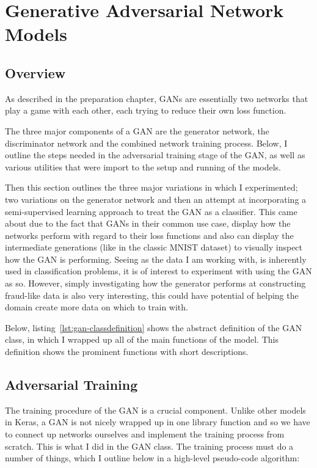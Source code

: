 \documentclass[12pt,a4paper,twoside]{report}
\begin{document}
\section{Generative Adversarial Network Models}

\subsection{Overview}
As described in the preparation chapter, GANs are essentially two networks that play a game with each other, each trying to reduce their own loss function. 

The three major components of a GAN are the generator network, the discriminator network and the combined network training process. Below, I outline the steps needed in the adversarial training stage of the GAN, as well as various utilities that were import to the setup and running of the models. 

Then this section outlines the three major variations in which I experimented; two variations on the generator network and then an attempt at incorporating a semi-supervised learning approach to treat the GAN as a classifier. This came about due to the fact that GANs in their common use case, display how the networks perform with regard to their loss functions and also can display the intermediate generations (like in the classic MNIST dataset) to visually inspect how the GAN is performing. Seeing as the data I am working with, is inherently used in classification problems, it is of interest to experiment with using the GAN as so. However, simply investigating how the generator performs at constructing fraud-like data is also very interesting, this could have potential of helping the domain create more data on which to train with. 

Below, listing~\ref{lst:gan-classdefinition} shows the abstract definition of the GAN class, in which I wrapped up all of the main functions of the model. This definition shows the prominent functions with short descriptions. 


\subsection{Adversarial Training}

The training procedure of the GAN is a crucial component. Unlike other models in Keras, a GAN is not nicely wrapped up in one library function and so we have to connect up networks ourselves and implement the training process from scratch. This is what I did in the GAN class. The training process must do a number of things, which I outline below in a high-level pseudo-code algorithm:
\end{document}

